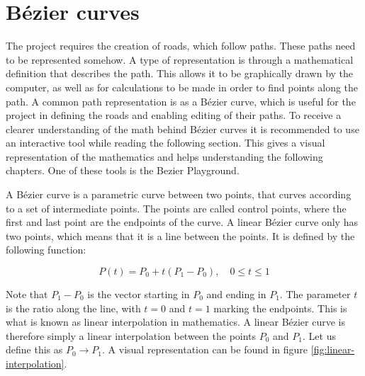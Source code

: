 \newcommand{\timeconstraint}{, \quad 0 \le t \le 1}
\newcommand{\lerp}{\rightarrow}
\newcommand{\p}[1]{P\textsubscript{#1}}

\section{Bézier curves}
    The project requires the creation of roads, which follow paths. These paths need to be represented somehow. A type of representation is through a mathematical definition that describes the path. This allows it to be graphically drawn by the computer, as well as for calculations to be made in order to find points along the path. A common path representation is as a Bézier curve, which is useful for the project in defining the roads and enabling editing of their paths. To receive a clearer understanding of the math behind Bézier curves it is recommended to use an interactive tool while reading the following section. This gives a visual representation of the mathematics and helps understanding the following chapters. One of these tools is the Bezier Playground\cite{bezier-playground}.

    A Bézier curve is a parametric curve between two points, that curves according to a set of intermediate points\cite{bezier-curves}. The points are called control points, where the first and last point are the endpoints of the curve. A linear Bézier curve only has two points, which means that it is a line between the points. It is defined by the following function:

    $$
        P(t) = P_0 + t(P_1 - P_0) \timeconstraint
    $$

    Note that $P_1 - P_0$ is the vector starting in $P_0$ and ending in $P_1$. The parameter $t$ is the ratio along the line, with $t = 0$ and $t = 1$ marking the endpoints. This is what is known as linear interpolation in mathematics. A linear Bézier curve is therefore simply a linear interpolation between the points $P_0$ and $P_1$. Let us define this as $P_0 \lerp P_1$. A visual representation can be found in figure \ref{fig:linear-interpolation}.


